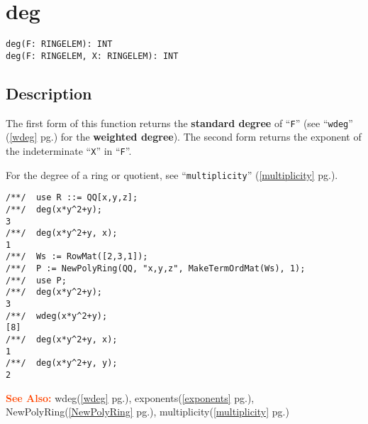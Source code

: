 \documentclass[a4paper]{mybook}
\newenvironment{command}{}{} %
\newcommand\SeeAlso{\par\textcolor{OrangeRed}{\textbf{\large See Also: }}}
\begin{document}
\section{deg}
\label{deg}
\begin{command} %


\begin{Verbatim}[label=syntax, rulecolor=\color{MidnightBlue},
frame=single]
deg(F: RINGELEM): INT
deg(F: RINGELEM, X: RINGELEM): INT
\end{Verbatim}


\subsection*{Description}

The first form of this function returns the \textbf{standard degree} of ``\verb&F&''
(see ``\verb&wdeg&'' (\ref{wdeg} pg.\pageref{wdeg}) for the \textbf{weighted degree}).
The second form returns the exponent of the indeterminate ``\verb&X&'' in ``\verb&F&''.
\par 
For the degree of a ring or quotient, see ``\verb&multiplicity&'' (\ref{multiplicity} pg.\pageref{multiplicity}).
\begin{Verbatim}[label=example, rulecolor=\color{PineGreen}, frame=single]
/**/  use R ::= QQ[x,y,z];
/**/  deg(x*y^2+y);
3
/**/  deg(x*y^2+y, x);
1
/**/  Ws := RowMat([2,3,1]);
/**/  P := NewPolyRing(QQ, "x,y,z", MakeTermOrdMat(Ws), 1);
/**/  use P;
/**/  deg(x*y^2+y);
3
/**/  wdeg(x*y^2+y);
[8]
/**/  deg(x*y^2+y, x);
1
/**/  deg(x*y^2+y, y);
2
\end{Verbatim}


\SeeAlso %
  wdeg(\ref{wdeg} pg.\pageref{wdeg}), 
    exponents(\ref{exponents} pg.\pageref{exponents}), 
    NewPolyRing(\ref{NewPolyRing} pg.\pageref{NewPolyRing}), 
    multiplicity(\ref{multiplicity} pg.\pageref{multiplicity})
\end{command} %
\end{document}
